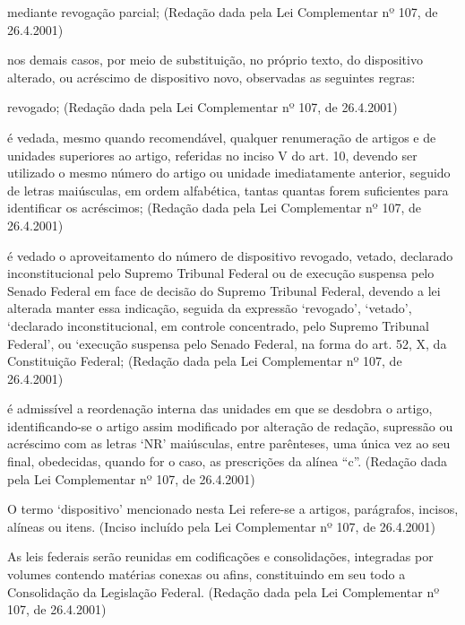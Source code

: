 \documentclass[calibri]{brlex2}
\begin{document}
\inc mediante revogação parcial;      (Redação dada pela Lei Complementar nº 107, de 26.4.2001)

\inc nos demais casos, por meio de substituição, no próprio texto, do dispositivo alterado, ou acréscimo de dispositivo novo, observadas as seguintes regras:

\alinea revogado;    (Redação dada pela Lei Complementar nº 107, de 26.4.2001)

\alinea é vedada, mesmo quando recomendável, qualquer renumeração de artigos e de unidades superiores ao artigo, referidas no inciso V do art. 10, devendo ser utilizado o mesmo número do artigo ou unidade imediatamente anterior, seguido de letras maiúsculas, em ordem alfabética, tantas quantas forem suficientes para identificar os acréscimos;      (Redação dada pela Lei Complementar nº 107, de 26.4.2001)

\alinea é vedado o aproveitamento do número de dispositivo revogado, vetado, declarado inconstitucional pelo Supremo Tribunal Federal ou de execução suspensa pelo Senado Federal em face de decisão do Supremo Tribunal Federal, devendo a lei alterada manter essa indicação, seguida da expressão ‘revogado’, ‘vetado’, ‘declarado inconstitucional, em controle concentrado, pelo Supremo Tribunal Federal’, ou ‘execução suspensa pelo Senado Federal, na forma do art. 52, X, da Constituição Federal;        (Redação dada pela Lei Complementar nº 107, de 26.4.2001)

\alinea é admissível a reordenação interna das unidades em que se desdobra o artigo, identificando-se o artigo assim modificado por alteração de redação, supressão ou acréscimo com as letras ‘NR’ maiúsculas, entre parênteses, uma única vez ao seu final, obedecidas, quando for o caso, as prescrições da alínea ``c''.       (Redação dada pela Lei Complementar nº 107, de 26.4.2001)

\parun O termo ‘dispositivo’ mencionado nesta Lei refere-se a artigos, parágrafos, incisos, alíneas ou itens.     (Inciso incluído pela Lei Complementar nº 107, de 26.4.2001)



\art As leis federais serão reunidas em codificações e consolidações, integradas por volumes contendo matérias conexas ou afins, constituindo em seu todo a Consolidação da Legislação Federal.   (Redação dada pela Lei Complementar nº 107, de 26.4.2001)
\end{document}
